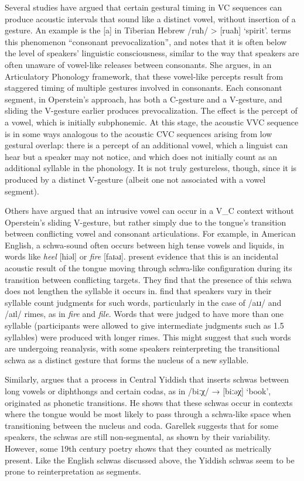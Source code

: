 \documentclass[output=paper,colorlinks,citecolor=brown]{langscibook}
\begin{document}
Several studies have argued that certain gestural timing in VC sequences can produce acoustic intervals that sound like a distinct vowel, without insertion of a gesture. An example is the [a] in Tiberian Hebrew /ruħ/ > [ruaħ] ‘spirit’. \citet{operstein2010consonant} terms this phenomenon “consonant prevocalization”, and notes that it is often below the level of speakers’ linguistic consciousness, similar to the way that speakers are often unaware of vowel-like releases between consonants. She argues, in an Articulatory Phonology framework, that these vowel-like percepts result from staggered timing of multiple gestures involved in consonants. Each consonant segment, in Operstein’s approach, has both a C-gesture and a V-gesture, and sliding the V-gesture earlier produces prevocalization. The effect is the percept of a vowel, which is initially subphonemic. At this stage, the acoustic VVC sequence is in some ways analogous to the acoustic CVC sequences arising from low gestural overlap: there is a percept of an additional vowel, which a linguist can hear but a speaker may not notice, and which does not initially count as an additional syllable in the phonology. It is not truly gestureless, though, since it is produced by a distinct V-gesture (albeit one not associated with a vowel segment).

Others have argued that an intrusive vowel can occur in a V\_C context without Operstein’s sliding V-gesture, but rather simply due to the tongue’s transition between conflicting vowel and consonant articulations. For example, in American English, a schwa-sound often occurs between high tense vowels and liquids, in words like \textit{heel} [hiəl] or \textit{fire} [faɪəɹ]. \citet{gick2006excrescent} present evidence that this is an incidental acoustic result of the tongue moving through schwa-like configuration during its transition between conflicting targets. They find that the presence of this schwa does not lengthen the syllable it occurs in. \citet{cohn2015relation} find that speakers vary in their syllable count judgments for such words, particularly in the case of /aɪɹ/ and /aɪl/ rimes, as in \textit{fire} and \textit{file}. Words that were judged to have more than one syllable (participants were allowed to give intermediate judgments such as 1.5 syllables) were produced with longer rimes. This might suggest that such words are undergoing reanalysis, with some speakers reinterpreting the transitional schwa as a distinct gesture that forms the nucleus of a new syllable. 

Similarly, \citet{garellek2020phonetics} argues that a process in Central Yiddish that inserts schwas between long vowels or diphthongs and certain codas, as in /biːχ/ → [biːəχ] ‘book’, originated as phonetic transitions. He shows that these schwas occur in contexts where the tongue would be most likely to pass through a schwa-like space when transitioning between the nucleus and coda. Garellek suggests that for some speakers, the schwas are still non-segmental, as shown by their variability. However, some 19th century poetry shows that they counted as metrically present. Like the English schwas discussed above, the Yiddish schwas seem to be prone to reinterpretation as segments. 
\end{document}
